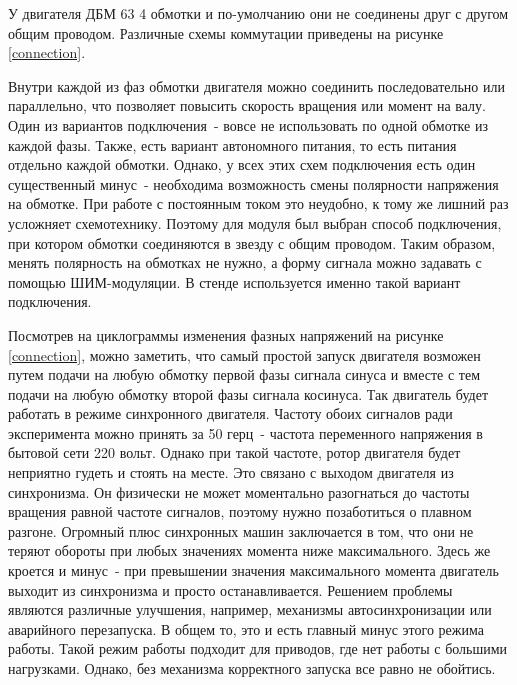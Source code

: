 У двигателя ДБМ 63 4 обмотки и по-умолчанию они не соединены друг с другом общим проводом.
Различные схемы коммутации приведены на рисунке \ref{connection}.

Внутри каждой из фаз обмотки двигателя можно соединить последовательно или параллельно,
что позволяет повысить скорость вращения или момент на валу. Один из вариантов подключения~- 
вовсе не использовать по одной обмотке из каждой фазы. Также, есть вариант автономного
питания, то есть питания отдельно каждой обмотки. Однако, у всех этих схем подключения есть
один существенный минус~- необходима возможность смены полярности напряжения на обмотке.
При работе с постоянным током это неудобно, к тому же лишний раз усложняет схемотехнику.
Поэтому для модуля был выбран способ подключения, при котором обмотки соединяются
в звезду с общим проводом. Таким образом, менять полярность на обмотках не нужно,
а форму сигнала можно задавать с помощью ШИМ-модуляции. В стенде используется именно
такой вариант подключения.


Посмотрев на циклограммы изменения фазных напряжений на рисунке \ref{connection},
можно заметить, что самый простой запуск двигателя возможен путем подачи на 
любую обмотку первой фазы сигнала синуса и вместе с тем подачи на любую обмотку 
второй фазы сигнала косинуса. Так двигатель будет работать в режиме синхронного двигателя.
Частоту обоих сигналов ради эксперимента можно принять
за 50 герц~- частота переменного напряжения в бытовой сети 220 вольт.
Однако при такой частоте, ротор двигателя будет неприятно гудеть и стоять на месте. 
Это связано с выходом двигателя из синхронизма. Он физически не может моментально 
разогнаться до частоты вращения равной частоте сигналов, поэтому нужно позаботиться 
о плавном разгоне. Огромный плюс синхронных машин заключается в том, что они не 
теряют обороты при любых значениях момента ниже максимального. Здесь же кроется 
и минус~- при превышении значения максимального момента двигатель выходит из 
синхронизма и просто останавливается. Решением проблемы являются различные улучшения,
например, механизмы автосинхронизации или аварийного перезапуска.
В общем то, это и есть главный минус этого режима работы. Такой режим работы подходит
для приводов, где нет работы с большими нагрузками. Однако, без механизма корректного запуска
все равно не обойтись.

